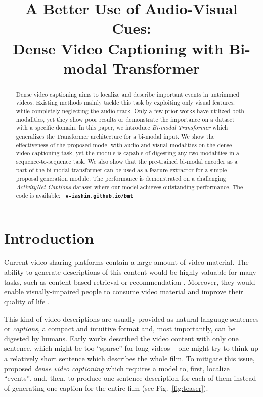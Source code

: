 \documentclass{src/bmvc2k}
\title{A Better Use of Audio-Visual Cues: \\Dense Video Captioning with Bi-modal Transformer}
\begin{document}
\maketitle

\begin{abstract}
Dense video captioning aims to localize and describe important events in untrimmed videos. Existing methods mainly tackle this task by exploiting only visual features, while completely neglecting the audio track. Only a few prior works have utilized both modalities, yet they show poor results or demonstrate the importance on a dataset with a specific domain. In this paper, we introduce \textit{Bi-modal Transformer} which generalizes the Transformer architecture for a bi-modal input. We show the effectiveness of the proposed model with audio and visual modalities on the dense video captioning task, yet the module is capable of digesting any two modalities in a sequence-to-sequence task. We also show that the pre-trained bi-modal encoder as a part of the bi-modal transformer can be used as a feature extractor for a simple proposal generation module. The performance is demonstrated on a challenging \textit{ActivityNet Captions} dataset where our model achieves outstanding performance. The code is available: \textbf{\texttt{\color{blue} v-iashin.github.io/bmt}}
\end{abstract}

\section{Introduction \label{sec:intro}}
Current video sharing platforms contain a large amount of video material. The ability to generate descriptions of this content would be highly valuable for many tasks, such as content-based retrieval or recommendation \cite{Tran2015,HowTo100M_Miech2019}. Moreover, they would enable visually-impaired people to consume video material and improve their quality of life \cite{LSMDC_Rohrbach_2017}.

This kind of video descriptions are usually provided as natural language sentences or \textit{captions}, a compact and intuitive format and, most importantly, can be digested by humans. Early works \cite{Yao2015,Video2Text_Venugopalan2015,Venugopalan2015b,Yu2016} described the video content with only one sentence, which might be too ``sparse'' for long videos -- one might try to think up a relatively short sentence which describes the whole film. To mitigate this issue, \cite{Krishna2017} proposed \textit{dense video captioning} which requires a model to, first, localize ``events'', and, then, to produce one-sentence description for each of them instead of generating one caption for the entire film (see Fig.~\ref{fig:teaser}).
\end{document}
